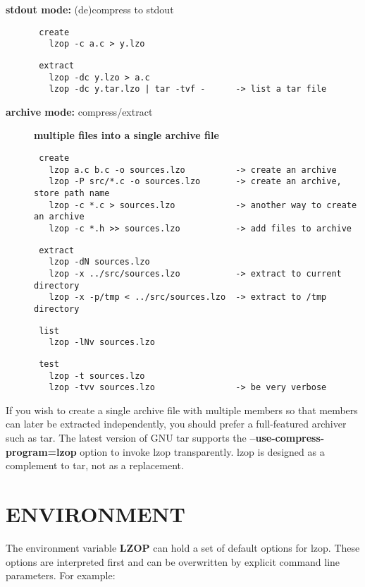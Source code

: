 \begin{description}
\item[\textbf{stdout mode:} (de)compress to stdout] \mbox{}\begin{verbatim}
 create
   lzop -c a.c > y.lzo
\end{verbatim}
\begin{verbatim}
 extract
   lzop -dc y.lzo > a.c
   lzop -dc y.tar.lzo | tar -tvf -      -> list a tar file
\end{verbatim}

\item[\textbf{archive mode:} compress/extract] \textbf{multiple files into a single archive file}\begin{verbatim}
 create
   lzop a.c b.c -o sources.lzo          -> create an archive
   lzop -P src/*.c -o sources.lzo       -> create an archive, store path name
   lzop -c *.c > sources.lzo            -> another way to create an archive
   lzop -c *.h >> sources.lzo           -> add files to archive
\end{verbatim}
\begin{verbatim}
 extract
   lzop -dN sources.lzo
   lzop -x ../src/sources.lzo           -> extract to current directory
   lzop -x -p/tmp < ../src/sources.lzo  -> extract to /tmp directory
\end{verbatim}
\begin{verbatim}
 list
   lzop -lNv sources.lzo
\end{verbatim}
\begin{verbatim}
 test
   lzop -t sources.lzo
   lzop -tvv sources.lzo                -> be very verbose
\end{verbatim}
\end{description}


If you wish to create a single archive file with multiple
members so that members can later be extracted independently,
you should prefer a full-featured archiver such as
tar. The latest version of GNU tar supports the
\textbf{--use-compress-program=lzop} option to invoke lzop transparently.
lzop is designed as a complement to tar, not as
a replacement.

\section{ENVIRONMENT\label{ENVIRONMENT}}


The environment variable \textbf{LZOP} can hold a set of default
options for lzop. These options are interpreted first and
can be overwritten by explicit command line parameters.
For example:


